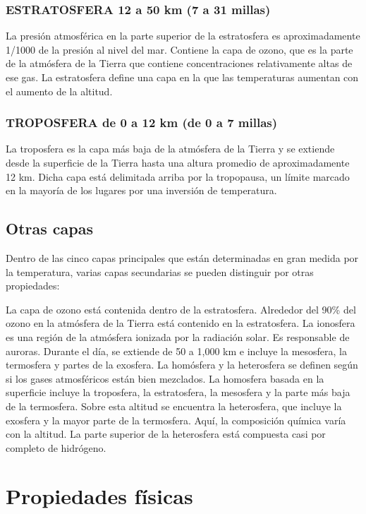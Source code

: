 \documentclass{article}
\begin{document}
\subsubsection{ESTRATOSFERA 12 a 50 km (7 a 31 millas)}
La presión atmosférica en la parte superior de la estratosfera es aproximadamente 1/1000 de la presión al nivel del mar. Contiene la capa de ozono, que es la parte de la atmósfera de la Tierra que contiene concentraciones relativamente altas de ese gas. La estratosfera define una capa en la que las temperaturas aumentan con el aumento de la altitud. 
\subsubsection{TROPOSFERA de 0 a 12 km (de 0 a 7 millas)}
 La troposfera es la capa más baja de la atmósfera de la Tierra y se extiende desde la superficie de la Tierra hasta una altura promedio de aproximadamente 12 km. Dicha capa está delimitada arriba por la tropopausa, un límite marcado en la mayoría de los lugares por una inversión de temperatura.
 
 
\subsection{Otras capas}

Dentro de las cinco capas principales que están determinadas en gran medida por la temperatura, varias capas secundarias se pueden distinguir por otras propiedades:

La capa de ozono está contenida dentro de la estratosfera. Alrededor del 90\% del ozono en la atmósfera de la Tierra está contenido en la estratosfera. La ionosfera es una región de la atmósfera ionizada por la radiación solar. Es responsable de auroras. Durante el día, se extiende de 50 a 1,000 km e incluye la mesosfera, la termosfera y partes de la exosfera. La homósfera y la heterosfera se definen según si los gases atmosféricos están bien mezclados. La homosfera basada en la superficie incluye la troposfera, la estratosfera, la mesosfera y la parte más baja de la termosfera. Sobre esta altitud se encuentra la heterosfera, que incluye la exosfera y la mayor parte de la termosfera. Aquí, la composición química varía con la altitud. La parte superior de la heterosfera está compuesta casi por completo de hidrógeno.





\section{Propiedades físicas}
\end{document}
